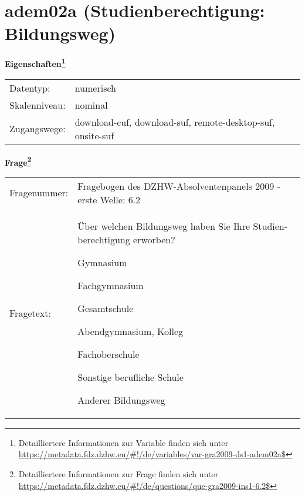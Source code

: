 
    \setcounter{footnote}{0}

    \vspace*{-1.8cm}
	\section{adem02a (Studienberechtigung: Bildungsweg)}
	\label{section:adem02a}



    \vspace*{0.5cm}
    \noindent\textbf{Eigenschaften\footnote{Detailliertere Informationen zur Variable finden sich unter
		\url{https://metadata.fdz.dzhw.eu/\#!/de/variables/var-gra2009-ds1-adem02a$}}}\\
	\begin{tabularx}{\hsize}{@{}lX}
	Datentyp: & numerisch \\
	Skalenniveau: & nominal \\
	Zugangswege: &
	  download-cuf, 
	  download-suf, 
	  remote-desktop-suf, 
	  onsite-suf
 \\
    \end{tabularx}



				\vspace*{0.5cm}
                \noindent\textbf{Frage\footnote{Detailliertere Informationen zur Frage finden sich unter
		              \url{https://metadata.fdz.dzhw.eu/\#!/de/questions/que-gra2009-ins1-6.2$}}}\\
				\begin{tabularx}{\hsize}{@{}lX}
					Fragenummer: &
					  Fragebogen des DZHW-Absolventenpanels 2009 - erste Welle:
					  6.2
 \\
					Fragetext: & Über welchen Bildungsweg haben Sie Ihre Studien- berechtigung erworben?\par  Gymnasium\par  Fachgymnasium\par  Gesamtschule\par  Abendgymnasium, Kolleg\par  Fachoberschule\par  Sonstige berufliche Schule\par  Anderer Bildungsweg \\
				\end{tabularx}





